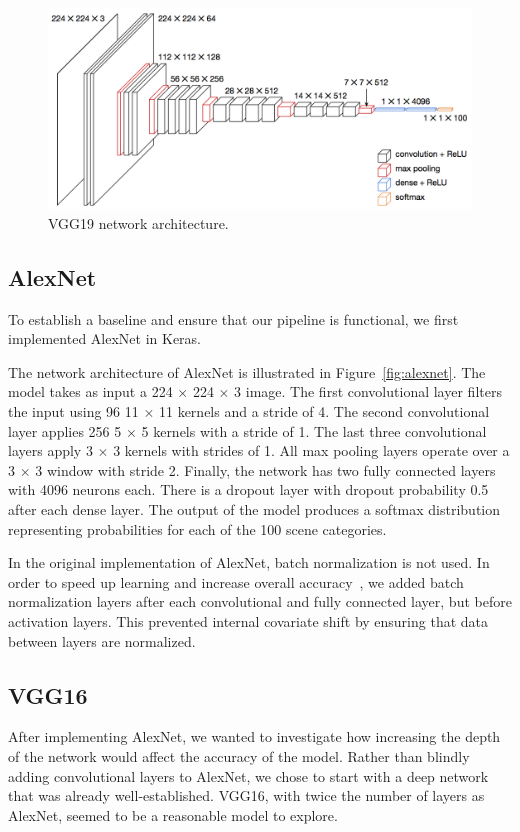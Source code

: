 \documentclass[10pt,twocolumn,letterpaper]{article}
\begin{document}
\begin{figure}[ht]
\centering
\includegraphics[width=.62\linewidth]{imgs/vgg19.png}
\caption{VGG19 network architecture.}
\label{fig:vgg19}
\end{figure}

\subsection{AlexNet}
To establish a baseline and ensure that our pipeline is functional, we first implemented AlexNet in Keras.

The network architecture of AlexNet is illustrated in Figure~\ref{fig:alexnet}. The model takes as input a 224 $\times$ 224 $\times$ 3 image. The first convolutional layer filters the input using 96 11 $\times$ 11 kernels and a stride of 4. The second convolutional layer applies 256 5 $\times$ 5 kernels with a stride of 1. The last three convolutional layers apply 3 $\times$ 3 kernels with strides of 1. All max pooling layers operate over a 3 $\times$ 3 window with stride 2. Finally, the network has two fully connected layers with 4096 neurons each. There is a dropout layer with dropout probability 0.5 after each dense layer. The output of the model produces a softmax distribution representing probabilities for each of the 100 scene categories.

In the original implementation of AlexNet, batch normalization is not used. In order to speed up learning and increase overall accuracy~\cite{batchnorm}, we added batch normalization layers after each convolutional and fully connected layer, but before activation layers. This prevented internal covariate shift by ensuring that data between layers are normalized.

\subsection{VGG16}

After implementing AlexNet, we wanted to investigate how increasing the depth of the network would affect the accuracy of the model. Rather than blindly adding convolutional layers to AlexNet, we chose to start with a deep network that was already well-established. VGG16, with twice the number of layers as AlexNet, seemed to be a reasonable model to explore.
\end{document}
